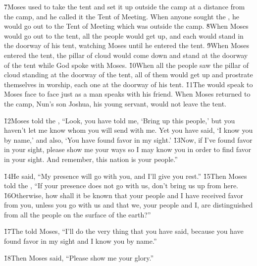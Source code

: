 \v{7}Moses used to take the tent and set it up outside the camp at a distance from the camp, and he called it the Tent of Meeting. When anyone sought the , he would go out to the Tent of Meeting which was outside the camp. \v{8}When Moses would go out to the tent, all the people would get up, and each would stand in the doorway of his tent, watching Moses until he entered the tent. \v{9}When Moses entered the tent, the pillar of cloud would come down and stand at the doorway of the tent while God spoke with Moses. \v{10}When all the people saw the pillar of cloud standing at the doorway of the tent, all of them would get up and prostrate themselves in worship, each one at the doorway of his tent. \v{11}The  would speak to Moses face to face just as a man speaks with his friend. When Moses returned to the camp, Nun's son Joshua, his young servant, would not leave the tent.

\v{12}Moses told the , ``Look, you have told me, `Bring up this people,' but you haven't let me know whom you will send with me. Yet you have said, `I know you by name,' and also, `You have found favor in my sight.' \v{13}Now, if I've found favor in your sight, please show me your ways so I may know you in order to find favor in your sight. And remember, this nation is your people.''

\v{14}He said, ``My presence will go with you, and I'll give you rest.'' \v{15}Then Moses told the , ``If your presence does not go with us, don't bring us up from here. \v{16}Otherwise, how shall it be known that your people and I have received favor from you, unless you go with us and that we, your people and I, are distinguished from all the people on the surface of the earth?''

\v{17}The  told Moses, ``I'll do the very thing that you have said, because you have found favor in my sight and I know you by name.''

\v{18}Then Moses said, ``Please show me your glory.''

